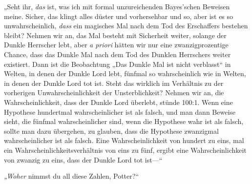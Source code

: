 „Seht ihr, \emph{das} ist, was ich mit formal unzureichenden Bayes’schen Beweisen meine. Sicher, das klingt alles düster und vorhersehbar und so, aber ist es so unwahrscheinlich, \emph{dass} ein magisches Mal nach dem Tod des Erschaffers bestehen bleibt? Nehmen wir an, das Mal besteht mit Sicherheit weiter, solange der Dunkle Herrscher lebt, aber \emph{a priori} hätten wir nur eine zwanzigprozentige Chance, dass das Dunkle Mal nach dem Tod des Dunklen Herrschers weiter existiert. Dann ist die Beobachtung „Das Dunkle Mal ist nicht verblasst“ in Welten, in denen der Dunkle Lord lebt, fünfmal so wahrscheinlich wie in Welten, in denen der Dunkle Lord tot ist. Steht das wirklich im Verhältnis zu der vorherigen Unwahrscheinlichkeit der Unsterblichkeit? Nehmen wir an, die Wahrscheinlichkeit, dass der Dunkle Lord überlebt, stünde 100:1. Wenn eine Hypothese hundertmal wahrscheinlicher ist als falsch, und man dann Beweise sieht, die fünfmal wahrscheinlicher sind, wenn die Hypothese wahr ist als falsch, sollte man dazu übergehen, zu glauben, dass die Hypothese zwanzigmal wahrscheinlicher ist als falsch. Eine Wahrscheinlichkeit von hundert zu eins, mal ein Wahrscheinlichkeitsverhältnis von eins zu fünf, ergibt eine Wahrscheinlichkeit von zwanzig zu eins, dass der Dunkle Lord tot ist—“

\emph{„Woher} nimmst du all diese Zahlen, Potter?“

